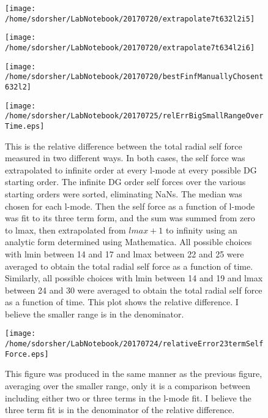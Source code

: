 \documentclass{article}
\begin{document}
\begin{figure}
  \texttt{[image: /home/sdorsher/LabNotebook/20170720/extrapolate7t632l2i5]}
\end{figure}

\begin{figure}
  \texttt{[image: /home/sdorsher/LabNotebook/20170720/extrapolate7t634l2i6]}
\end{figure}

\begin{figure}
  \texttt{[image: /home/sdorsher/LabNotebook/20170720/bestFinfManuallyChosent632l2]}
\end{figure}




\begin{figure}
  \texttt{[image: /home/sdorsher/LabNotebook/20170725/relErrBigSmallRangeOverTime.eps]}
  \caption{This is the relative difference between the total radial self force measured in two different ways. In both cases, the self force was extrapolated to infinite order at every l-mode at every possible DG starting order. The infinite DG order self forces over the various starting orders were sorted, eliminating NaNs. The median was chosen for each l-mode. Then the self force as a function of l-mode was fit to its three term form, and the sum was summed from zero to lmax, then extrapolated from $lmax +1 $ to infinity using an analytic form determined using Mathematica. All possible choices with lmin between 14 and 17 and lmax between 22 and 25 were averaged to obtain the total radial self force as a function of time. Similarly, all possible choices with lmin between 14 and 19 and lmax between 24 and 30 were averaged to obtain the total radial self force as a function of time. This plot shows the relative difference. I believe the smaller range is in the denominator.}
\end{figure}

\newpage

\begin{figure}
  \texttt{[image: /home/sdorsher/LabNotebook/20170724/relativeError23termSelfForce.eps]}
  \caption{This figure was produced in the same manner as the previous figure, averaging over the smaller range, only it is a comparison between including either two or three terms in the l-mode fit. I believe the three term fit is in the denominator of the relative difference.}
\end{figure}
\end{document}
